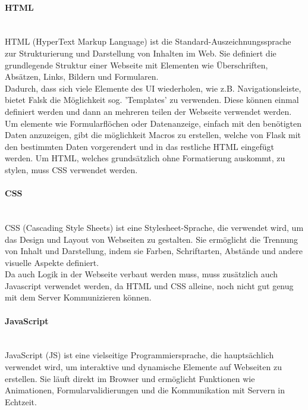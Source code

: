 \paragraph{HTML}\mbox{}\\
HTML (HyperText Markup Language) ist die Standard-Auszeichnungssprache zur Strukturierung und Darstellung von Inhalten im Web. Sie definiert die grundlegende Struktur einer Webseite mit Elementen wie Überschriften, Absätzen, Links, Bildern und Formularen. \cite{chatgpt}\\

Dadurch, dass sich viele Elemente des UI wiederholen, wie z.B. Navigationsleiste, bietet Falsk die Möglichkeit sog. 'Templates' zu verwenden. Diese können einmal definiert werden und dann an mehreren teilen der Webseite verwendet werden.
Um elemente wie Formularflöchen oder Datenanzeige, einfach mit den benötigten Daten anzuzeigen, gibt die möglichkeit Macros zu erstellen, welche von Flask mit den bestimmten Daten vorgerendert und in das restliche HTML eingefügt werden.
Um HTML, welches grundsätzlich ohne Formatierung auskommt, zu stylen, muss CSS verwendet werden. 

\paragraph{CSS}\mbox{}\\
CSS (Cascading Style Sheets) ist eine Stylesheet-Sprache, die verwendet wird, um das Design und Layout von Webseiten zu gestalten. Sie ermöglicht die Trennung von Inhalt und Darstellung, indem sie Farben, Schriftarten, Abstände und andere visuelle Aspekte definiert.\cite{chatgpt}\\

Da auch Logik in der Webseite verbaut werden muss, muss zusätzlich auch Javascript verwendet werden, da HTML und CSS alleine, noch nicht gut genug mit dem Server Kommunizieren können.

\paragraph{JavaScript}\mbox{}\\
JavaScript (JS) ist eine vielseitige Programmiersprache, die hauptsächlich verwendet wird, um interaktive und dynamische Elemente auf Webseiten zu erstellen. Sie läuft direkt im Browser und ermöglicht Funktionen wie Animationen, Formularvalidierungen und die Kommunikation mit Servern in Echtzeit.\cite{chatgpt}\\

